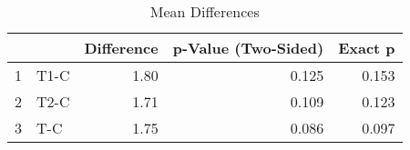 \begin{table}[ht]
\centering
\caption{Mean Differences} 
\begin{tabular}{rlrrr}
  \hline
 &  & Difference & p-Value (Two-Sided) & Exact p \\ 
  \hline
1 & T1-C & 1.80 & 0.125 & 0.153 \\ 
  2 & T2-C & 1.71 & 0.109 & 0.123 \\ 
  3 & T-C & 1.75 & 0.086 & 0.097 \\ 
   \hline
\end{tabular}
\end{table}
